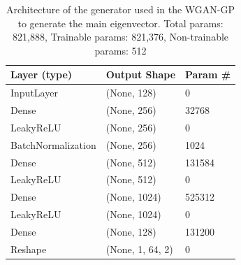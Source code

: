 \documentclass{article}
\begin{document}
\begin{table}[]
    \begin{tabular}{|l|l|l|}
        \hline
        \textbf{Layer (type)} & \textbf{Output Shape} & \textbf{Param \#} \\ \hline
        InputLayer            & (None, 128)           & 0                 \\ \hline
        Dense                 & (None, 256)           & 32768             \\ \hline
        LeakyReLU             & (None, 256)           & 0                 \\ \hline
        BatchNormalization    & (None, 256)           & 1024              \\ \hline
        Dense                 & (None, 512)           & 131584            \\ \hline
        LeakyReLU             & (None, 512)           & 0                 \\ \hline
        Dense                 & (None, 1024)          & 525312            \\ \hline
        LeakyReLU             & (None, 1024)          & 0                 \\ \hline
        Dense                 & (None, 128)           & 131200            \\ \hline
        Reshape               & (None, 1, 64, 2)      & 0                 \\ \hline
    \end{tabular}
    \caption{Architecture of the generator used in the WGAN-GP to generate the main eigenvector. Total params: 821,888, Trainable params: 821,376, Non-trainable params: 512}
    \label{tab:main_evec_generator_WGANGP_architecture}
\end{table}
\end{document}
